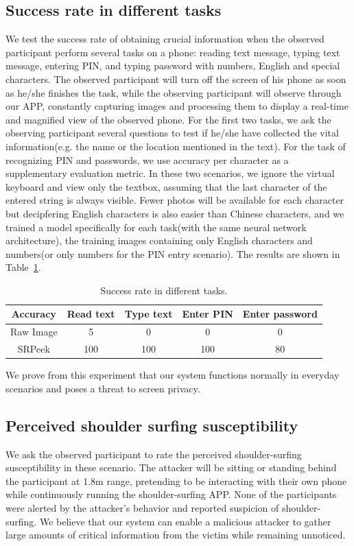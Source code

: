 \subsection{Success rate in different tasks}
We test the success rate of obtaining crucial information when the observed participant perform several tasks on a phone: reading text message, typing text message, entering PIN, and typing password with numbers, English and special characters. The observed participant will turn off the screen of his phone as soon as he/she finishes the task, while the observing participant will observe through our APP, constantly capturing images and processing them to display a real-time and magnified view of the observed phone. For the first two tasks, we ask the observing participant several questions to test if he/she have collected the vital information(e.g. the name or the location mentioned in the text). For the task of recognizing PIN and passwords, we use accuracy per character as a supplementary evaluation metric. In these two scenarios, we ignore the virtual keyboard and view only the textbox, assuming that the last character of the entered string is always visible. Fewer photos will be available for each character but decipfering English characters is also easier than Chinese characters, and we trained a model specifically for each task(with the same neural network architecture), the training images containing only English characters and numbers(or only numbers for the PIN entry scenario). The results are shown in Table~\ref{table-task}.

\begin{table}[!t]
\centering
\caption{Success rate in different tasks.}
\label{table-task}
\begin{tabular}{@{}ccccc@{}}
	\toprule
Accuracy & Read text & Type text & Enter PIN & Enter password\\ \midrule
Raw Image & 5 & 0 & 0 & 0\\
SRPeek & 100 & 100 & 100 & 80\\ \bottomrule
\end{tabular}

\end{table}

We prove from this experiment that our system functions normally in everyday scenarios and poses a threat to screen privacy.

\subsection{Perceived shoulder surfing susceptibility}
We ask the observed participant to rate the perceived shoulder-surfing susceptibility in these scenario. The attacker will be sitting or standing behind the participant at 1.8m range, pretending to be interacting with their own phone while continuously running the shoulder-surfing APP. None of the participants were alerted by the attacker's behavior and reported suspicion of shoulder-surfing. We believe that our system can enable a malicious attacker to gather large amounts of critical information from the victim while remaining unnoticed.




